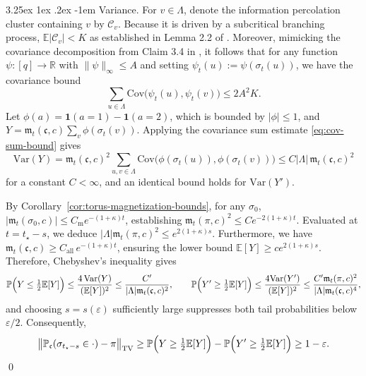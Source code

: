 \documentclass[letterpaper,11pt,reqno]{amsart}
\makeatletter
\theoremstyle{definition}
\newcommand{\abs}[1]{\left\vert#1\right\vert}
\renewcommand\paragraph{\@startsection{paragraph}{4}{\z@}%
  {3.25ex \@plus1ex \@minus.2ex}%
  {-1em}%
  {\normalfont\normalsize\bfseries}}
\makeatother
\begin{document}
\paragraph{Variance.}
For $v\in \Lambda$, denote the information percolation cluster containing $v$ by $\mathcal{C}_v$. Because it is driven by a subcritical branching process, $\mathbb{E}|\mathcal{C}_v|<K$ as established in Lemma 2.2 of \cite{Universality}. Moreover, mimicking the covariance decomposition from Claim 3.4 in \cite{Universality}, it follows that for any function $\psi:[q]\to\mathbb R$ with $\|\psi\|_\infty\le A$ and setting $\psi_t(u):=\psi(\sigma_t(u))$, we have the covariance bound
\begin{equation}\label{eq:cov-sum-bound}
    \sum_{u\in \Lambda}\mathrm{Cov}\big(\psi_t(u),\psi_t(v)\big) \le 2A^2K.
\end{equation}
Let $\phi(a)=\mathbf 1(a=1)-\mathbf 1(a=2)$, which is bounded by $|\phi|\le 1$, and $Y=\mathfrak{m}_t(\mathfrak{c},c)\sum_{v}\phi(\sigma_t(v))$. Applying the covariance sum estimate \eqref{eq:cov-sum-bound} gives
\[
    \mathrm{Var}(Y) = \mathfrak{m}_t(\mathfrak{c},c)^2\sum_{u,v\in\Lambda}\mathrm{Cov}\big(\phi(\sigma_t(u)),\phi(\sigma_t(v))\big) \le C|\Lambda|\,\mathfrak{m}_t(\mathfrak{c},c)^2
\]
for a constant $C<\infty$, and an identical bound holds for $\mathrm{Var}(Y')$.

By Corollary~\ref{cor:torus-magnetization-bounds}, for any $\sigma_0$, $\abs{\mathfrak{m}_t(\sigma_0,c)}\leq C_{\mathrm{m}}e^{-(1+\kappa)t}$, establishing $\mathfrak{m}_t(\pi,c)^2\leq C e^{-2(1+\kappa)t}$.
Evaluated at $t=t_\star-s$, we deduce $|\Lambda|\mathfrak{m}_t(\pi,c)^2\leq e^{2(1+\kappa)s}$. 
Furthermore, we have $\mathfrak{m}_t(\mathfrak{c},c) \ge C_{\mathrm{all}}\,e^{-(1+\kappa)t}$, ensuring the lower bound $\mathbb E[Y] \ge c e^{2(1+\kappa)s}$.
Therefore, Chebyshev's inequality gives
\[
    \mathbb P\Bigl(Y\le \tfrac12\mathbb E[Y]\Bigr) \le \frac{4\,\mathrm{Var}(Y)}{(\mathbb E[Y])^2} \le \frac{C'}{|\Lambda|\mathfrak{m}_t(\mathfrak{c},c)^2},
    \qquad
    \mathbb P\Bigl(Y'\ge \tfrac12\mathbb E[Y]\Bigr) \le \frac{4\mathrm{Var}(Y')}{(\mathbb E[Y])^2} \le \frac{C'\mathfrak{m}_t(\pi,c)^2}{|\Lambda|\mathfrak{m}_t(\mathfrak{c},c)^4},
\]
and choosing $s=s(\varepsilon)$ sufficiently large suppresses both tail probabilities below $\varepsilon/2$. Consequently,
\[
    \bigl\|\mathbb P_{\mathfrak{c}}(\sigma_{t_\star-s}\in\cdot)-\pi\bigr\|_{\mathrm{TV}} \ge \mathbb P\Bigl(Y\ge \tfrac12\mathbb E[Y]\Bigr) - \mathbb P\Bigl(Y'\ge \tfrac12\mathbb E[Y]\Bigr) \ge 1-\varepsilon.
\]
\qed
\end{document}
